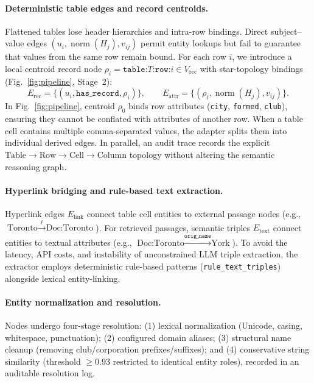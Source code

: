 \paragraph{Deterministic table edges and record centroids.}
Flattened tables lose header hierarchies and intra-row bindings. Direct subject--value edges $(u_i, \operatorname{norm}(H_j), v_{ij})$ permit entity lookups but fail to guarantee that values from the same row remain bound. For each row $i$, we introduce a local centroid record node $\rho_i = \texttt{table:}T\texttt{:row:}i \in V_{\text{rec}}$ with star-topology bindings (Fig.~\ref{fig:pipeline}, Stage~2):
\begin{equation}
\label{eq:star-topology}
E_{\text{rec}} = \{ (u_i, \texttt{has\_record}, \rho_i) \}, \qquad
E_{\text{attr}} = \{ (\rho_i, \operatorname{norm}(H_j), v_{ij}) \}.
\end{equation}
In Fig.~\ref{fig:pipeline}, centroid $\rho_0$ binds row attributes (\texttt{city}, \texttt{formed}, \texttt{club}), ensuring they cannot be conflated with attributes of another row. When a table cell contains multiple comma-separated values, the adapter splits them into individual derived edges. In parallel, an audit trace records the explicit $\text{Table} \rightarrow \text{Row} \rightarrow \text{Cell} \rightarrow \text{Column}$ topology without altering the semantic reasoning graph.

\paragraph{Hyperlink bridging and rule-based text extraction.}
Hyperlink edges $E_{\text{link}}$ connect table cell entities to external passage nodes (e.g., $\text{Toronto} \xrightarrow{\ell} \text{Doc:Toronto}$). For retrieved passages, semantic triples $E_{\text{text}}$ connect entities to textual attributes (e.g., $\text{Doc:Toronto} \xrightarrow{\texttt{orig\_name}} \text{York}$). To avoid the latency, API costs, and instability of unconstrained LLM triple extraction, the extractor employs deterministic rule-based patterns (\texttt{rule\_text\_triples}) alongside lexical entity-linking.

\paragraph{Entity normalization and resolution.}
Nodes undergo four-stage resolution: (1) lexical normalization (Unicode, casing, whitespace, punctuation); (2) configured domain aliases; (3) structural name cleanup (removing club/corporation prefixes/suffixes); and (4) conservative string similarity (threshold $\ge 0.93$ restricted to identical entity roles), recorded in an auditable resolution log.

